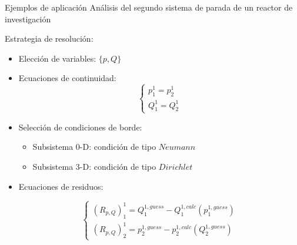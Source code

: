 \normalsize
\begin{frame}
{Ejemplos de aplicación}
{Análisis del segundo sistema de parada de un reactor de investigación}

Estrategia de resolución: 
\begin{itemize}
\item Elección de variables: $\{p,Q\}$
\item <2->Ecuaciones de continuidad:
\begin{equation*}
\left\{ \begin{array}{l}
p_1^1 = p_2^1 \\
Q_1^1 = Q_2^1
\end{array}
\right.
\end{equation*}
\item <3-> Selección de condiciones de borde:
    \begin{itemize}
    \item Subsistema 0-D: condición de tipo $Neumann$
    \item Subsistema 3-D: condición de tipo $Dirichlet$
    \end{itemize}
\item <4-> Ecuaciones de residuos:

\begin{equation*}
\left\{ \begin{array}{l}
(R_{p,Q})_{1}^{1} =Q_1^{1,guess} - Q_1^{1,calc}(p_1^{1,guess}) \\
(R_{p,Q})_{2}^{1} =p_2^{1,guess} - p_2^{1,calc}(Q_2^{1,guess})
\end{array}
\right.
\end{equation*}

\end{itemize}

\end{frame}



